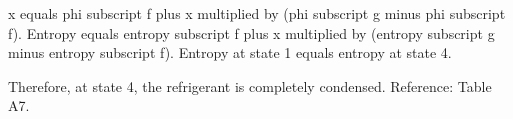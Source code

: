 x equals phi subscript f plus x multiplied by (phi subscript g minus phi subscript f).  
Entropy equals entropy subscript f plus x multiplied by (entropy subscript g minus entropy subscript f).  
Entropy at state 1 equals entropy at state 4.  

Therefore, at state 4, the refrigerant is completely condensed.  
Reference: Table A7.